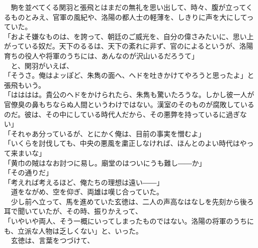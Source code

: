 \documentclass[
  paper=a5,
  fontsize=10pt,
  jafontsize=9.5pt,
  tate,                  %
  open_bracket_pos=nibu, %
]{jlreq}
\begin{document}
　駒を並べてくる関羽と張飛とはまだの無礼を思い出して、時々、腹が立ってくるものとみえ、官軍の風紀や、洛陽の都人士の軽薄を、しきりに声を大にしてっていた。\\


「およそ嫌なものは、を誇って、朝廷のご威光を、自分の偉さみたいに、思い上がっている奴だ。天下のるるは、天下の紊れに非ず、官のによるというが、洛陽育ちの役人や将軍のうちには、あんなのが沢山いるだろうて」\\


　と、関羽がいえば、\\


「そうさ。俺はよッぽど、朱雋の面へ、ヘドを吐きかけてやろうと思ったよ」と張飛もいう。\\


「はははは。貴公のヘドをかけられたら、朱雋も驚いたろうな。しかし彼一人が官僚臭の鼻もちならぬ人間というわけではない。漢室のそのものが腐敗しているのだ。彼は、その中にしている時代人だから、その悪弊を持っているに過ぎない」\\


「それゃあ分っているが、とにかく俺は、目前の事実を憎むよ」\\


「いくらを討伐しても、中央の悪風を粛正しなければ、ほんとのよい時代はやって来まいな」\\


「黄巾の賊はなお討つに易し。廟堂のはついにうも難し――か」\\


「その通りだ」\\


「考えれば考えるほど、俺たちの理想は遠い――」\\


　道をながめ、空を仰ぎ、両雄は嘆じ合っていた。\\


　少し前へ立って、馬を進めていた玄徳は、二人の声高なはなしを先刻から後ろ耳で聞いていたが、その時、振りかえって、\\


「いやいや両人、そう一概にいってしまったものではない。洛陽の将軍のうちにも、立派な人物は乏しくない」と、いった。\\


　玄徳は、言葉をつづけて、\\
\end{document}
